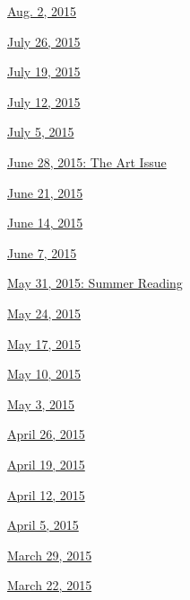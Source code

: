 \href{http://www.nytimes.com/indexes/2015/08/02/books/review/index.html}{Aug.
2, 2015}

\href{http://www.nytimes.com/indexes/2015/07/26/books/review/index.html}{July
26, 2015}

\href{http://www.nytimes.com/indexes/2015/07/19/books/review/index.html}{July
19, 2015}

\href{http://www.nytimes.com/indexes/2015/07/12/books/review/index.html}{July
12, 2015}

\href{http://www.nytimes.com/indexes/2015/07/05/books/review/index.html}{July
5, 2015}

\href{http://www.nytimes.com/interactive/2015/06/25/books/review/art-issue.html}{June
28, 2015: The Art Issue}

\href{http://www.nytimes.com/indexes/2015/06/21/books/review/index.html}{June
21, 2015}

\href{http://www.nytimes.com/indexes/2015/06/14/books/review/index.html}{June
14, 2015}

\href{http://www.nytimes.com/indexes/2015/06/07/books/review/index.html}{June
7, 2015}

\href{http://www.nytimes.com/indexes/2015/05/31/books/review/index.html}{May
31, 2015: Summer Reading}

\href{http://www.nytimes.com/indexes/2015/05/24/books/review/index.html}{May
24, 2015}

\href{http://www.nytimes.com/indexes/2015/05/17/books/review/index.html}{May
17, 2015}

\href{http://www.nytimes.com/indexes/2015/05/10/books/review/index.html}{May
10, 2015}

\href{http://www.nytimes.com/indexes/2015/05/03/books/review/index.html}{May
3, 2015}

\href{http://www.nytimes.com/indexes/2015/04/26/books/review/index.html}{April
26, 2015}

\href{http://www.nytimes.com/indexes/2015/04/19/books/review/index.html}{April
19, 2015}

\href{http://www.nytimes.com/indexes/2015/04/12/books/review/index.html}{April
12, 2015}

\href{http://www.nytimes.com/indexes/2015/04/05/books/review/index.html}{April
5, 2015}

\href{http://www.nytimes.com/indexes/2015/03/29/books/review/index.html}{March
29, 2015}

\href{http://www.nytimes.com/indexes/2015/03/22/books/review/index.html}{March
22, 2015}

